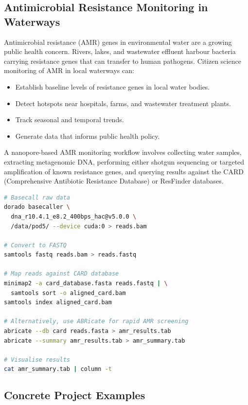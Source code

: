 \subsection{Antimicrobial Resistance Monitoring in Waterways}
\label{subsec:accessible:amr}

Antimicrobial resistance (\acrshort{AMR}) genes in environmental water are a growing public health concern. Rivers, lakes, and wastewater effluent harbour bacteria carrying resistance genes that can transfer to human pathogens. Citizen science monitoring of \acrshort{AMR} in local waterways can:

\begin{itemize}[itemsep=2pt]
  \item Establish baseline levels of resistance genes in local water bodies.
  \item Detect hotspots near hospitals, farms, and wastewater treatment plants.
  \item Track seasonal and temporal trends.
  \item Generate data that informs public health policy.
\end{itemize}

A nanopore-based \acrshort{AMR} monitoring workflow involves collecting water samples, extracting metagenomic DNA, performing either shotgun sequencing or targeted amplification of known resistance genes, and querying results against the CARD (Comprehensive Antibiotic Resistance Database) or ResFinder databases.

\begin{lstlisting}[language=bash,caption={AMR gene detection from environmental water using nanopore data.},label=lst:amr-detection]
# Basecall raw data
dorado basecaller \
  dna_r10.4.1_e8.2_400bps_hac@v5.0.0 \
  /data/pod5/ --device cuda:0 > reads.bam

# Convert to FASTQ
samtools fastq reads.bam > reads.fastq

# Map reads against CARD database
minimap2 -a card_database.fasta reads.fastq | \
  samtools sort -o aligned_card.bam
samtools index aligned_card.bam

# Alternatively, use ABRicate for rapid AMR screening
abricate --db card reads.fasta > amr_results.tab
abricate --summary amr_results.tab > amr_summary.tab

# Visualise results
cat amr_summary.tab | column -t
\end{lstlisting}

\subsection{Concrete Project Examples}
\label{subsec:accessible:projectexamples}


